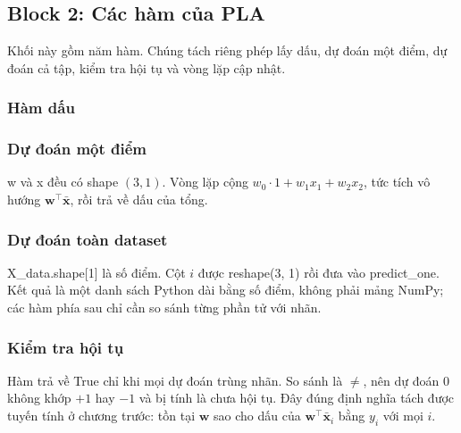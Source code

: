 \subsection{Block 2: Các hàm của PLA}
Khối này gồm năm hàm. Chúng tách riêng phép lấy dấu, dự đoán một điểm, dự đoán cả tập, kiểm tra hội tụ và vòng lặp cập nhật.

\subsubsection{Hàm dấu}


\subsubsection{Dự đoán một điểm}


\textsf{w} và \textsf{x} đều có shape \((3, 1)\). 
Vòng lặp cộng \(w_0 \cdot 1 + w_1 x_1 + w_2 x_2\), 
tức tích vô hướng \(\mathbf{w}^\top \bar{\mathbf{x}}\), rồi trả về dấu của tổng. 

\subsubsection{Dự đoán toàn dataset}


\textsf{X\_data.shape[1]} là số điểm. 
Cột \(i\) được \textsf{reshape(3, 1)} rồi đưa vào \textsf{predict\_one}. 
Kết quả là một danh sách Python dài bằng số điểm, không phải mảng NumPy; các hàm phía sau chỉ cần so sánh từng phần tử với nhãn.

\subsubsection{Kiểm tra hội tụ}


Hàm trả về \textsf{True} chỉ khi mọi dự đoán trùng nhãn. So sánh là \(\neq\), nên dự đoán \(0\) không khớp \(+1\) hay \(-1\) và bị tính là chưa hội tụ. Đây đúng định nghĩa tách được tuyến tính ở chương trước: tồn tại \(\mathbf{w}\) sao cho dấu của \(\mathbf{w}^\top \bar{\mathbf{x}}_i\) bằng \(y_i\) với mọi \(i\).

